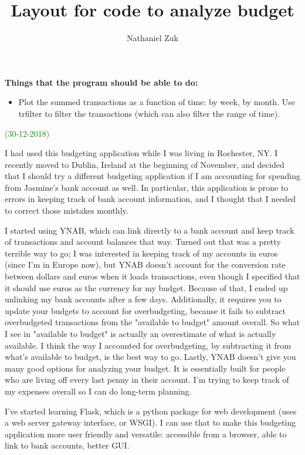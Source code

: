 \documentclass[11pt]{article}
\title{Layout for code to analyze budget}
\author{Nathaniel Zuk}
\begin{document}
\maketitle

\textbf{Things that the program should be able to do:}

\begin{itemize}
\item Plot the summed transactions as a function of time: by week, by month.  Use trfilter to filter the transactions (which can also filter the range of time).
\end{itemize}

\textcolor{green}{(30-12-2018)}

I had used this budgeting application while I was living in Rochester, NY.  I recently moved to Dublin, Ireland at the beginning of November, and decided that I should try a different budgeting application if I am accounting for spending from Jasmine's bank account as well.  In particular, this application is prone to errors in keeping track of bank account information, and I thought that I needed to correct those mistakes monthly.

I started using YNAB, which can link directly to a bank account and keep track of transactions and account balances that way.  Turned out that was a pretty terrible way to go; I was interested in keeping track of my accounts in euros (since I'm in Europe now), but YNAB doesn't account for the conversion rate between dollars and euros when it loads transactions, even though I specified that it should use euros as the currency for my budget.  Because of that, I ended up unlinking my bank accounts after a few days.  Additionally, it requires you to update your budgets to account for overbudgeting, because it fails to subtract overbudgeted transactions from the "available to budget" amount overall.  So what I see in "available to budget" is actually an overestimate of what is actually available.  I think the way I accounted for overbudgeting, by subtracting it from what's available to budget, is the best way to go.  Lastly, YNAB doesn't give you many good options for analyzing your budget.  It is essentially built for people who are living off every last penny in their account.  I'm trying to keep track of my expenses overall so I can do long-term planning.

I've started learning Flask, which is a python package for web development (uses a web server gateway interface, or WSGI).  I can use that to make this budgeting application more user friendly and versatile: accessible from a browser, able to link to bank accounts, better GUI.
\end{document}
